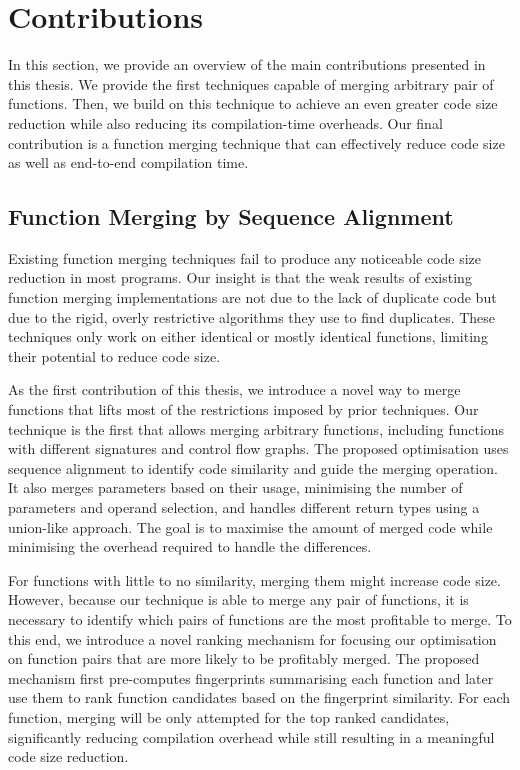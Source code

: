 \section{Contributions}

In this section, we provide an overview of the main contributions presented in this thesis.
We provide the first techniques capable of merging arbitrary pair of functions.
Then, we build on this technique to achieve an even greater code size reduction while also reducing its compilation-time overheads.
Our final contribution is a function merging technique that can effectively reduce code size as well as end-to-end compilation time.

\subsection{Function Merging by Sequence Alignment}


Existing function merging techniques fail to produce any noticeable code size reduction in most programs.
Our insight is that the weak results of existing function merging implementations are not due to the lack of duplicate code but due to the rigid, overly restrictive algorithms they use to find duplicates.
These techniques only work on either identical or mostly identical functions, limiting their potential to reduce code size.

As the first contribution of this thesis, we introduce a novel way to merge functions that lifts most of the restrictions imposed by prior techniques.
Our technique is the first that allows merging arbitrary functions, including functions with different signatures and control flow graphs.
The proposed optimisation uses sequence alignment to identify code similarity and guide the merging operation.
It also merges parameters based on their usage, minimising the number of parameters and operand selection, and handles different return types using a union-like approach.
The goal is to maximise the amount of merged code while minimising the overhead required to handle the differences.

For functions with little to no similarity, merging them might increase code size.
However, because our technique is able to merge any pair of functions, it is necessary to identify which pairs of functions are the most profitable to merge.
To this end, we introduce a novel ranking mechanism for focusing our optimisation on function pairs that are more likely to be profitably merged.
The proposed mechanism first pre-computes fingerprints summarising each function and later use them to rank function candidates based on the fingerprint similarity.
For each function, merging will be only attempted for the top ranked candidates, significantly reducing compilation overhead while still resulting in a meaningful code size reduction.

